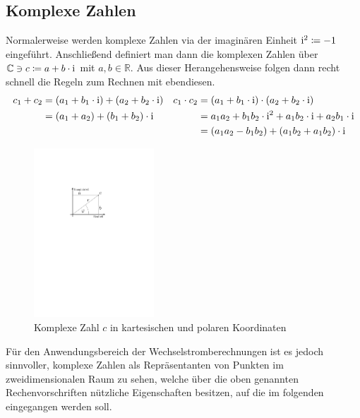 \subsection{Komplexe Zahlen}
Normalerweise werden komplexe Zahlen via der imaginären Einheit $\mathrm{i}^2 \coloneqq -1$ eingeführt.
Anschließend definiert man dann die komplexen Zahlen über $\mathbb{C} \ni c \coloneqq a + b\cdot \mathrm{i}$ mit $a,b \in \mathbb{R}$.
Aus dieser Herangehensweise folgen dann recht schnell die Regeln zum Rechnen mit ebendiesen.
\begin{align*}
    c_1 +c_2 &= (a_1 + b_1\cdot \mathrm{i}) + (a_2 + b_2\cdot \mathrm{i}) &
    c_1 \cdot c_2 &= (a_1 + b_1\cdot \mathrm{i}) \cdot (a_2 + b_2\cdot \mathrm{i}) \\
        &= (a_1 + a_2) + (b_1 + b_2)\cdot \mathrm{i}  &
        &= a_1a_2 + b_1b_2 \cdot \mathrm{i}^2 + a_1b_2 \cdot \mathrm{i} + a_2b_1 \cdot \mathrm{i}\\
        &&&= (a_1a_2 - b_1b_2) + (a_1b_2 + a_1b_2) \cdot \mathrm{i}
\end{align*}

\begin{figure}
  \begin{centering}
    \includegraphics[width=0.4\textwidth]{philip1.pdf}
  \end{centering}
  \caption{Komplexe Zahl $c$ in kartesischen und polaren Koordinaten}
\end{figure}

Für den Anwendungsbereich der Wechselstromberechnungen ist es jedoch sinnvoller, komplexe Zahlen als
Repräsentanten von Punkten im zweidimensionalen Raum zu sehen, welche über die oben genannten Rechenvorschriften nützliche Eigenschaften besitzen, auf die im folgenden eingegangen werden soll.

